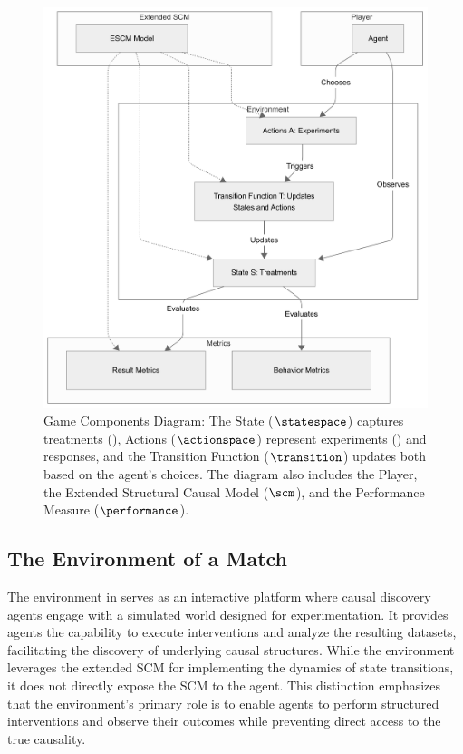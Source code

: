 \documentclass{uai2024} %
\begin{document}
        \begin{figure}[ht]
            \centering
            \includegraphics[width=0.7\columnwidth]{assets/game_components.png}
            \caption{
                Game Components Diagram: The State ($\statespace$) captures treatments (\treatments), Actions ($\actionspace$) represent experiments (\experiments) and responses, and the Transition Function ($\transition$) updates both based on the agent’s choices. The diagram also includes the Player, the Extended Structural Causal Model ($\scm$), and the Performance Measure ($\performance$).
            } 
            \label{fig:game_components}
        \end{figure}



    \subsection{The Environment of a Match}
        The environment in \game serves as an interactive platform where causal discovery agents engage with a simulated world designed for experimentation. 
        It provides agents the capability to execute interventions and analyze the resulting datasets, facilitating the discovery of underlying causal structures. 
        While the environment leverages the extended SCM for implementing the dynamics of state transitions, it does not directly expose the SCM to the agent.
        This distinction emphasizes that the environment’s primary role is to enable agents to perform structured interventions and observe their outcomes while preventing direct access to the true causality.
\end{document}
